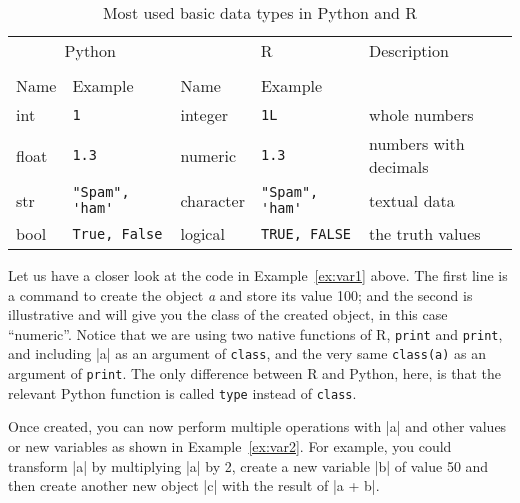 
\newcommand{\fndouble}{In R, double and numeric can generally be used
  interchangeably (there is a subtle difference, but that is not
  relevant here).}

\begin{table}
  \caption{\label{tab:types}Most used basic data types in Python and R}{
  \begin{tabularx}{\textwidth}{lllll}
    \toprule
    \multicolumn{2}{c}{Python} & \multicolumn{2}{c}{R}& Description \\
    \cmidrule(lr){1-2}    \cmidrule(lr){3-4}\\
    Name & Example & Name & Example \\
    \midrule
    int   & \verb+1+             & integer   & \verb+1L+             & whole numbers \\
    float & \verb+1.3+           & numeric   & \verb+1.3+           & numbers with decimals \\
    str   & \verb+"Spam", 'ham'+ & character & \verb+"Spam", 'ham'+ & textual data  \\ 
    bool  & \verb+True, False+   & logical   & \verb+TRUE, FALSE+   & the truth values \\
    \bottomrule
  \end{tabularx}}{}
\end{table}
    


Let us have a closer look at the code in Example~\ref{ex:var1} above.
The first line is a command to create the object \emph{a} and store
its value 100; and the second is illustrative and will give you the
class of the created object, in this case ``numeric''. Notice that we
are using two native functions of R, \texttt{print} and \texttt{print}, and
including |a| as an argument of \texttt{class}, and the very same
\texttt{class(a)} as an argument of \texttt{print}. The only difference
between R and Python, here, is that the relevant Python function is
called \texttt{type} instead of \texttt{class}.


Once created, you can now perform multiple operations
with |a| and other values or new variables as shown in Example~\ref{ex:var2}. For example, you
could transform |a| by multiplying |a| by 2, create a new
variable |b| of value 50 and then create another new object
|c| with the result of |a + b|.

